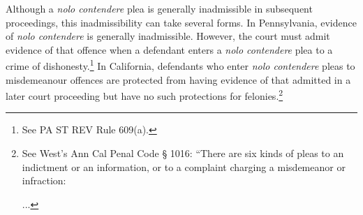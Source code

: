 Although a \textit{nolo contendere} plea is generally inadmissible in subsequent proceedings, this inadmissibility can take several forms. In Pennsylvania, evidence of \textit{nolo contendere} is generally inadmissible. However, the court must admit evidence of that offence when a defendant enters a \textit{nolo contendere} plea to a crime of dishonesty.\footnote{See PA ST REV Rule 609(a).} In California, defendants who enter \textit{nolo contendere} pleas to misdemeanour offences are protected from having evidence of that admitted in a later court proceeding but have no such protections for felonies.\footnote{See West's Ann Cal Penal Code § 1016: ``There are six kinds of pleas to an indictment or an information, or to a complaint charging a misdemeanor or infraction:

... 

}

